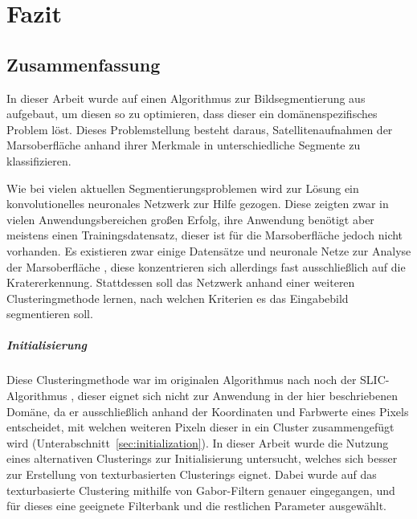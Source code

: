 \chapter{Fazit}
\label{chap:fazit}

\section{Zusammenfassung}

In dieser Arbeit wurde auf einen Algorithmus zur Bildsegmentierung aus \cite{kanezaki_18} aufgebaut, um diesen so zu optimieren, dass dieser ein domänenspezifisches Problem löst. Dieses Problemstellung besteht daraus, Satellitenaufnahmen der Marsoberfläche anhand ihrer Merkmale in unterschiedliche Segmente zu klassifizieren.

Wie bei vielen aktuellen Segmentierungsproblemen wird zur Lösung ein konvolutionelles neuronales Netzwerk zur Hilfe gezogen. Diese zeigten zwar in vielen Anwendungsbereichen großen Erfolg, ihre Anwendung benötigt aber meistens einen Trainingsdatensatz, dieser ist für die Marsoberfläche jedoch nicht vorhanden. Es existieren zwar einige Datensätze und neuronale Netze zur Analyse der Marsoberfläche \cite{cohen_16}, diese konzentrieren sich allerdings fast ausschließlich auf die Kratererkennung. Stattdessen soll das Netzwerk anhand einer weiteren Clusteringmethode lernen, nach welchen Kriterien es das Eingabebild segmentieren soll.

\paragraph{Initialisierung} Diese Clusteringmethode war im originalen Algorithmus nach \cite{kanezaki_18} noch der SLIC-Algorithmus \cite{achanta_10}, dieser eignet sich nicht zur Anwendung in der hier beschriebenen Domäne, da er ausschließlich anhand der Koordinaten und Farbwerte eines Pixels entscheidet, mit welchen weiteren Pixeln dieser in ein Cluster zusammengefügt wird (\vgl Unterabschnitt~\ref{sec:initialization}). In dieser Arbeit wurde die Nutzung eines alternativen Clusterings zur Initialisierung untersucht, welches sich besser zur Erstellung von texturbasierten Clusterings eignet. Dabei wurde auf das texturbasierte Clustering mithilfe von Gabor-Filtern \cite{jain_91} genauer eingegangen, und für dieses eine geeignete Filterbank und die restlichen Parameter ausgewählt.

